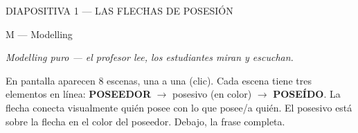 \documentclass[a4paper,10pt]{article}
\begin{document}
\newpage


\begin{diapoheader}{DIAPOSITIVA 1 --- LAS FLECHAS DE POSESI\'ON}
\end{diapoheader}

\vspace{0.3cm}

\begin{marsfase}{M --- Modelling}
\end{marsfase}

\vspace{0.2cm}

\textit{Modelling puro --- el profesor lee, los estudiantes miran y escuchan.}

\vspace{0.3cm}

En pantalla aparecen 8 escenas, una a una (clic). Cada escena tiene tres elementos en l\'inea: \textbf{POSEEDOR} $\rightarrow$ posesivo (en color) $\rightarrow$ \textbf{POSE\'IDO}. La flecha conecta visualmente qui\'en posee con lo que posee/a qui\'en. El posesivo est\'a sobre la flecha en el color del poseedor. Debajo, la frase completa.

\vspace{0.5cm}
\end{document}
